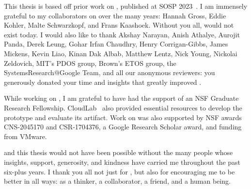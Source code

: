
%
This thesis is based off prior work on \sys, published at SOSP 2023~\cite{edna}.
I am immensely grateful to my collaborators on \sys over the many years: Hannah
Gross, Eddie Kohler, Malte Schwarzkopf, and Frans Kaashoek. Without you all,
\sys would not exist today.
%
I would also like to thank Akshay Narayan, Anish Athalye, Aurojit Panda, Derek
Leung, Gohar Irfan Chaudhry, Henry Corrigan-Gibbs, James Mickens, Kevin Liao,
Kinan Dak Albab, Matthew Lentz, Nick Young, Nickolai Zeldovich, MIT's PDOS
group, Brown's ETOS group, the SystemsResearch@Google Team, and all our
anonymous reviewers: you generously donated your time and insights that greatly
improved \sys. 
%

%
While working on \sys, I am grateful to have had the support of an NSF Graduate
Research Fellowship.  CloudLab~\cite{cloudlab} also provided essential resources
to develop the \sys prototype and evaluate its artifact.
%
Work on \sys was also supported by NSF awards CNS-2045170 and CSR-1704376, a
Google Research Scholar award, and funding from VMware.
%

%
\sys and this thesis would not have been possible without the many people whose
insights, support, generosity, and kindness have carried me throughout the past
six-plus years.
%
I thank you all not just for \sys, but also for encouraging me to be better in
all ways: as a thinker, a collaborator, a friend, and a human being.

